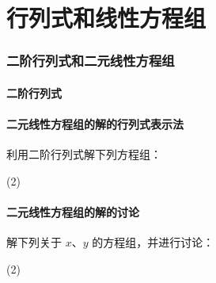 \chapter{行列式和线性方程组}
\subsection{二阶行列式和二元线性方程组}
\subsubsection{二阶行列式}
\begin{Practice}
  \begin{question}
    \item 
    \item 
  \end{question}
\end{Practice}

\subsubsection{二元线性方程组的解的行列式表示法}
\begin{Practice}
  利用二阶行列式解下列方程组：
  \begin{tasks}(2)
    \task 
    \task 
  \end{tasks}
\end{Practice}

\subsubsection{二元线性方程组的解的讨论}
\begin{Practice}
  解下列关于 $x$、$y$ 的方程组，并进行讨论：
  \begin{tasks}(2)
    \task 
    \task 
  \end{tasks}
\end{Practice}

\begin{Exercise}
  \begin{question}
    \item 
    \item 
    \item 
    \item 
    \item 
    \item 
    \item 
  \end{question}
\end{Exercise}

